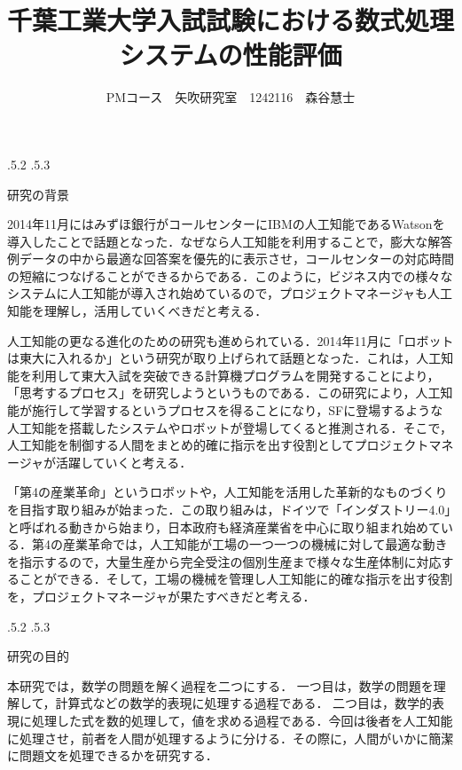 \documentclass[uplatex]{jsarticle}
\title{\vspace{-14mm}千葉工業大学入試試験における数式処理システムの性能評価}
\author{PMコース　矢吹研究室　1242116　森谷慧士}
\date{}%
\makeatletter
\renewcommand{\section}{%
    \if@slide\clearpage\fi
    \@startsection{section}{1}{\z@}%
    {\Cvs \@plus.5\Cdp \@minus.2\Cdp}%
    {.5\Cvs \@plus.3\Cdp}%
    {\normalfont\raggedright}}
\makeatother
\begin{document}
\maketitle






\section{研究の背景}

2014年11月にはみずほ銀行がコールセンターにIBMの人工知能であるWatsonを導入したことで話題となった\cite{mizuho2014}．なぜなら人工知能を利用することで，膨大な解答例データの中から最適な回答案を優先的に表示させ，コールセンターの対応時間の短縮につなげることができるからである．このように，ビジネス内での様々なシステムに人工知能が導入され始めているので，プロジェクトマネージャも人工知能を理解し，活用していくべきだと考える．
 
人工知能の更なる進化のための研究も進められている．2014年11月に「ロボットは東大に入れるか」という研究が取り上げられて話題となった\cite{tourobo2014}．これは，人工知能を利用して東大入試を突破できる計算機プログラムを開発することにより，「思考するプロセス」を研究しようというものである．この研究により，人工知能が施行して学習するというプロセスを得ることになり，SFに登場するような人工知能を搭載したシステムやロボットが登場してくると推測される．そこで，人工知能を制御する人間をまとめ的確に指示を出す役割としてプロジェクトマネージャが活躍していくと考える．

「第4の産業革命」というロボットや，人工知能を活用した革新的なものづくりを目指す取り組みが始まった．この取り組みは，ドイツで「インダストリー4.0」と呼ばれる動きから始まり，日本政府も経済産業省を中心に取り組まれ始めている\cite{sangyou2014}．第4の産業革命では，人工知能が工場の一つ一つの機械に対して最適な動きを指示するので，大量生産から完全受注の個別生産まで様々な生産体制に対応することができる．そして，工場の機械を管理し人工知能に的確な指示を出す役割を，プロジェクトマネージャが果たすべきだと考える．




\section{研究の目的}

本研究では，数学の問題を解く過程を二つにする．
一つ目は，数学の問題を理解して，計算式などの数学的表現に処理する過程である．
二つ目は，数学的表現に処理した式を数的処理して，値を求める過程である．今回は後者を人工知能に処理させ，前者を人間が処理するように分ける．その際に，人間がいかに簡潔に問題文を処理できるかを研究する．
\end{document}
